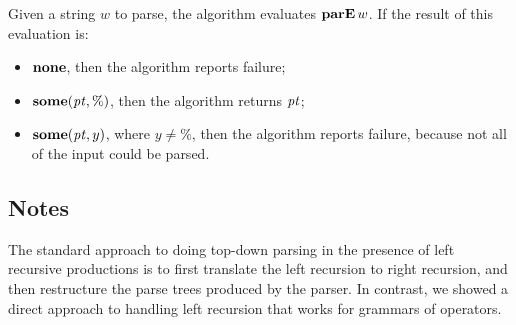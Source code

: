 Given a string $w$ to parse, the algorithm evaluates
$\mathbf{parE}\,w$.  If the result of this evaluation is:
\begin{itemize}
\item $\mathbf{none}$, then the algorithm reports failure;

\item $\mathbf{some}({\it pt},\%)$, then the algorithm returns ${\it pt}$;

\item $\mathbf{some}({\it pt},y)$, where $y\neq\%$, then the algorithm reports failure,
  because not all of the input could be parsed.
\end{itemize}

\subsection{Notes}

The standard approach to doing top-down parsing in the presence of
left recursive productions is to first translate the left recursion to
right recursion, and then restructure the parse trees produced by the
parser.  In contrast, we showed a direct approach to handling left
recursion that works for grammars of operators.

%

